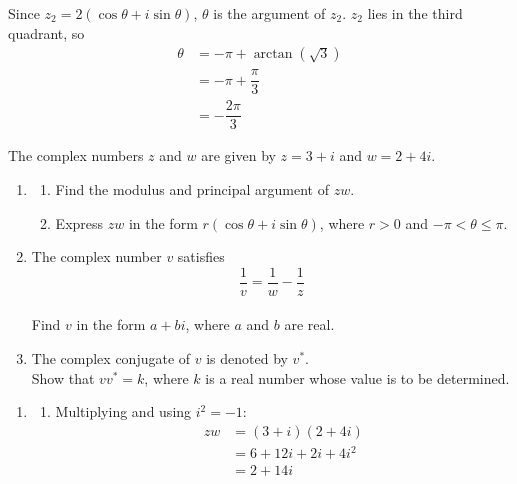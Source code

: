 \documentclass[leqno]{article}
\begin{document}
\begin{enumerate}[
  label=\textbf{\arabic*.},
  leftmargin=*,
  topsep=0pt,
  partopsep=0pt,
  parsep=0pt
]
\begin{djsSolution}
\begin{enumerate}[label=\textbf{(\alph*)}, start=1]
\begin{enumerate}[label=(\roman*), start=1]
Since \(z_2=2(\cos\theta+i\sin\theta)\), \(\theta\) is the argument of \(z_2\). \(z_2\) lies in the third quadrant, so
\begin{align*}
\theta&=-\pi+\arctan(\sqrt{3})\\
&=-\pi+\dfrac{\pi}{3}\\
&=-\dfrac{2\pi}{3}
\end{align*}

\end{enumerate}
\end{enumerate}
\end{djsSolution}

\newpage

\questionitem

The complex numbers $z$ and $w$ are given by $z=3+i$ and $w=2+4i$. \\
\begin{enumerate}[label=\textbf{(\alph*)}]
\item
\begin{enumerate}[label=(\roman*)]
\item Find the modulus and principal argument of $zw$.
\item Express $zw$ in the form $r(\cos\theta+i\sin\theta)$, where $r>0$ and $-\pi<\theta\leq\pi$.
\end{enumerate}
\item The complex number $v$ satisfies
\[
\frac{1}{v}=\frac{1}{w}-\frac{1}{z}
\] \\
Find $v$ in the form $a+bi$, where $a$ and $b$ are real.  \\
\item The complex conjugate of $v$ is denoted by $v^*$. \\
Show that $vv^*=k$, where $k$ is a real number whose value is to be determined.  \\
\end{enumerate}

\vspace*{10pt}

\begin{djsSolution}
\begin{enumerate}[label=\textbf{(\alph*)}, start=1]
\item
\begin{enumerate}[label=(\roman*), start=1]
\item Multiplying and using \(i^2=-1\):
\begin{align*}
zw&=(3+i)(2+4i)\\
&=6+12i+2i+4i^2\\
&=2+14i
\end{align*}


\end{enumerate}
\end{enumerate}
\end{djsSolution}
\end{enumerate}
\end{document}
